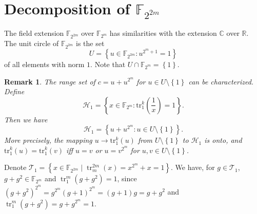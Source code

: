 \documentclass[12pt,a4paper]{ctexbook}
\newcommand{\0}{\textbf{0}}
\newcommand{\1}{\textbf{1}}
\newcommand{\tr}{\mathrm{tr}_1^k}
\newcommand{\F}{\mathbb{F}}
\newcommand{\Com}{\mathbb{C}}
\newcommand{\R}{\mathbb{R}}
\newtheorem{remark}{Remark}
\begin{document}
\section{Decomposition of $ \F_{2^{2m}} $} 
    The field extension $ \F_{2^{2m}} $ over $ \F_{2^m} $ has similarities with the extension $ \Com $ over $ \R $.
    The unit circle of $ \F_{2^{2m}} $ is the set 
    \[U=\left\{ u\in\F_{2^{2m}}:u^{2^m+1}=1 \right\}\]
    of all elements with norm $ 1 $.
    Note that $ U\cap\F_{2^m}=\left\{ 1 \right\} $.
    \begin{remark}
        The range set of $ c=u+u^{2^m} $ for $ u\in U\setminus\left\{ 1 \right\} $ can be characterized. Define
        \[\mathcal{H}_1=\left\{ x\in\F_{2^m}:\tr(\frac{1}{x})=1 \right\}.\]
        Then we have 
        \[\mathcal{H}_1=\left\{ u+u^{2^m}:u\in U\setminus\left\{ 1 \right\} \right\}.\]
        More precisely, the mapping $ u\rightarrow\tr(u) $ from $ U\setminus\left\{ 1 \right\} $ to $ \mathcal{H}_1 $ 
        is onto, and $ \tr(u)=\tr(v) $ iff $ u=v $ or $ u=v^{2^m} $ for $ u,v\in U\setminus\left\{ 1 \right\} $. 
    \end{remark}
    Denote $ \mathcal{T}_1=\left\{ x\in\F_{2^{2m}}\mid \operatorname{tr}_m^{2m}(x)=x^{2^m}+x=1 \right\} $. 
    We have, for $ g\in\mathcal{T}_1 $, $ g+g^2\in\F_{2^m} $ and $ \operatorname{tr}_1^m(g+g^2)=1 $, 
    since $ (g+g^2)^{2^m}=g^{2^m}(g+1)^{2^m}=(g+1)g=g+g^2 $ and $ \operatorname{tr}_1^m(g+g^2)=g+g^{2^m}=1 $.
\end{document}
